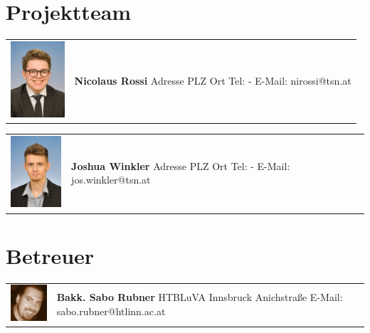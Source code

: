 \section*{Projektteam}


\begin{tabular}[t]{p{2cm} p{5cm}}
    \vspace{0pt}
    \includegraphics[width=2cm]{../images/nicolaus.jpg}
    &
    \vspace{0pt}
    \textbf{Nicolaus Rossi}
    \newline Adresse
    \newline PLZ Ort
    \newline
    \newline Tel: -
    \newline E-Mail: nirossi@tsn.at
    \\
\end{tabular}

\begin{tabular}[t]{p{2cm} p{5cm}}
    \vspace{0pt}
    \includegraphics[width=2cm]{../images/joshua.jpg}
    &
    \vspace{0pt}
    \textbf{Joshua Winkler}
    \newline Adresse
    \newline PLZ Ort
    \newline
    \newline Tel: -
    \newline E-Mail: jos.winkler@tsn.at
    \\
\end{tabular}

\section*{Betreuer}

\begin{tabular}[t]{p{2cm} p{7cm}}
    \vspace{0pt}
    \includegraphics[width=2cm]{../images/sabo.jpg}
    &
    \vspace{0pt}
    \textbf{Bakk. Sabo Rubner}
    \newline HTBLuVA Innsbruck Anichstraße
    \newline
    \newline E-Mail: sabo.rubner@htlinn.ac.at
    \\
\end{tabular}

\newpage